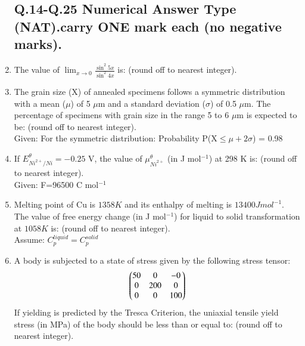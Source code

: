 \documentclass[journal]{IEEEtran}
\theoremstyle{remark}
\begin{document}
\begin{enumerate}
\subsection*{Q.14-Q.25 Numerical Answer Type (NAT).carry ONE mark each (no negative marks).}

\item The value of $\lim_{x\to 0} \frac{\sin^2{5x}}{\sin^2{4x}}$ is: \underline {\hspace{2cm}} (round off to nearest integer). \hfill{}

\item The grain size (X) of annealed specimens follows a symmetric distribution with a mean ($\mu$) of 5 $\mu$m and a standard deviation ($\sigma$) of 0.5 $\mu$m. The percentage of specimens with grain size in the range 5 to 6 $\mu$m is expected to be: \underline {\hspace{2cm}} (round off to nearest integer). \\ Given: For the symmetric distribution: Probability P(X$\leq \mu + 2\sigma$) = 0.98 \hfill{}

\item If $E^\theta_{Ni^{2+}/Ni} = -0.25$ V, the value of $\mu^\theta_{Ni^{2+}}$ (in J mol$^{-1}$) at 298 K is: \underline {\hspace{2cm}} (round off to nearest integer). \\ Given: F=96500 C mol$^{-1}$ \hfill{}

\item Melting point of Cu is $1358 K$ and its enthalpy of melting is $13400 J mol^{-1}$. The value of free energy change (in J mol$^{-1}$) for liquid to solid transformation at $1058 K$ is: \underline {\hspace{2cm}} (round off to nearest integer). \\ Assume: $C_p^{liquid} = C_p^{solid}$ \hfill{}

\item A body is subjected to a state of stress given by the following stress tensor: \hfill{}
\begin{align}
    \begin{pmatrix} 50 & 0 & -0 \\ 0 & 200 & 0 \\ 0 & 0 & 100\end{pmatrix} 
\end{align}
If yielding is predicted by the Tresca Criterion, the uniaxial tensile yield stress (in MPa) of the body should be less than or equal to: \underline {\hspace{2cm}} (round off to nearest integer). \hfill{}


\end{enumerate}
\end{document}
